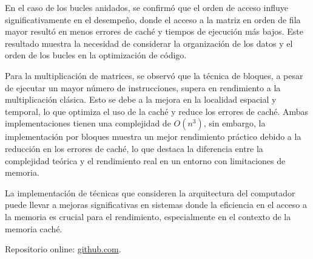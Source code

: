 \documentclass[conference]{IEEEtran}
\begin{document}
En el caso de los bucles anidados, se confirmó que el orden de acceso influye significativamente en el desempeño, donde el acceso a la matriz en orden de fila mayor resultó en menos errores de caché y tiempos de ejecución más bajos. Este resultado muestra la necesidad de considerar la organización de los datos y el orden de los bucles en la optimización de código.

Para la multiplicación de matrices, se observó que la técnica de bloques, a pesar de ejecutar un mayor número de instrucciones, supera en rendimiento a la multiplicación clásica. Esto se debe a la mejora en la localidad espacial y temporal, lo que optimiza el uso de la caché y reduce los errores de caché. Ambas implementaciones tienen una complejidad de $O(n^3)$, sin embargo, la implementación por bloques muestra un mejor rendimiento práctico debido a la reducción en los errores de caché, lo que destaca la diferencia entre la complejidad teórica y el rendimiento real en un entorno con limitaciones de memoria.

La implementación de técnicas que consideren la arquitectura del computador puede llevar a mejoras significativas en sistemas donde la eficiencia en el acceso a la memoria es crucial para el rendimiento, especialmente en el contexto de la memoria caché.

Repositorio online:
\href{https://github.com/fernandoramirez1337/cache_test/tree/main}{github.com}.





\vspace{12pt}
\end{document}
